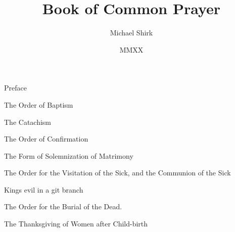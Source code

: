 \documentclass[foolscapvopaper,11pt,twoside,openany,extrafontsizes,final]{memoir}
\begin{document}
\frontmatter
\title{Book of Common Prayer}
\author{Michael Shirk}
\date{MMXX}

\tableofcontents*


Preface


\mainmatter

\mainmatter









% 

The Order of Baptism

The Catachism

The Order of Confirmation



The Form of Solemnization of Matrimony

The Order for the Visitation of the Sick, and the Communion of the Sick

Kings evil in a git branch

The Order for the Burial of the Dead.

The Thanksgiving of Women after Child-birth


\end{document}
